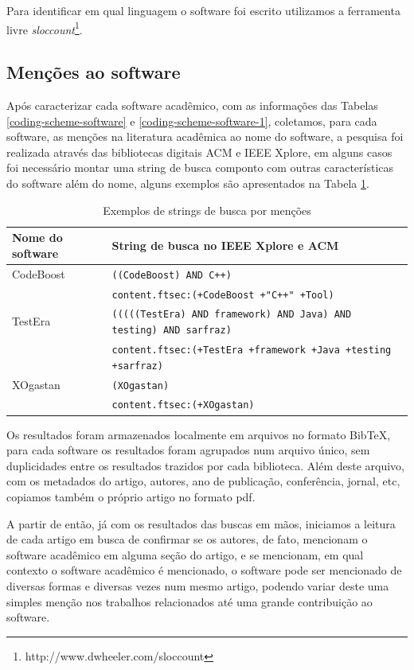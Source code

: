 Para identificar em qual linguagem o software foi escrito utilizamos a
ferramenta livre {\it sloccount}\footnote{http://www.dwheeler.com/sloccount}.

\subsection{Menções ao software}

Após caracterizar cada software acadêmico, com as informações das Tabelas
\ref{coding-scheme-software} e \ref{coding-scheme-software-1}, coletamos, para
cada software, as menções na literatura acadêmica ao nome do software, a
pesquisa foi realizada através das bibliotecas digitais ACM e IEEE Xplore, em
alguns casos foi necessário montar uma string de busca componto com outras
características do software além do nome, alguns exemplos são apresentados na
Tabela \ref{exemplos-strings}.

\begin{table}[h]
\caption{Exemplos de strings de busca por menções}
\centering
\begin{tabular}{ l p{10cm} }
  \hline
  Nome do software   & String de busca no IEEE Xplore e ACM \\
  \hline
  CodeBoost          & {\tt ((CodeBoost) AND C++)} \\
                     & {\tt content.ftsec:(+CodeBoost +"C++" +Tool)} \\
  \hline
  TestEra            & {\tt (((((TestEra) AND framework) AND Java) AND testing) AND sarfraz)} \\
                     & {\tt content.ftsec:(+TestEra +framework +Java +testing +sarfraz)} \\
  \hline
  XOgastan           & {\tt (XOgastan)} \\
                     & {\tt content.ftsec:(+XOgastan)} \\
  \hline
\end{tabular}
\label{exemplos-strings}
\end{table}

Os resultados foram armazenados localmente em arquivos no formato BibTeX, para
cada software os resultados foram agrupados num arquivo único, sem duplicidades
entre os resultados trazidos por cada biblioteca. Além deste arquivo, com os
metadados do artigo, autores, ano de publicação, conferência, jornal, etc,
copiamos também o próprio artigo no formato pdf.

A partir de então, já com os resultados das buscas em mãos, iniciamos a leitura
de cada artigo em busca de confirmar se os autores, de fato, mencionam o
software acadêmico em alguma seção do artigo, e se mencionam, em qual contexto
o software acadêmico é mencionado, o software pode ser mencionado de diversas
formas e diversas vezes num mesmo artigo, podendo variar deste uma simples
menção nos trabalhos relacionados até uma grande contribuição ao software.

